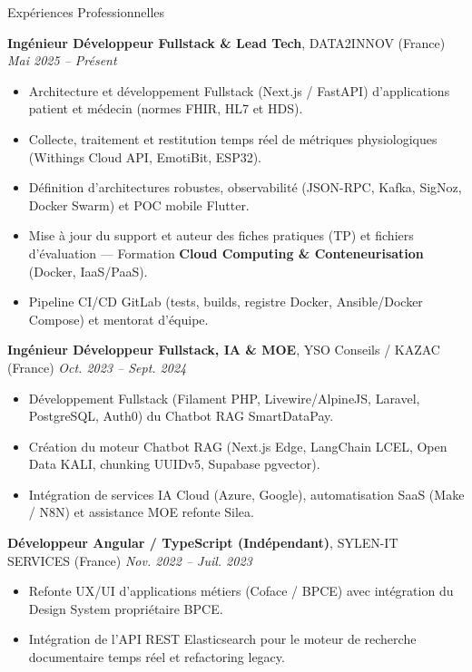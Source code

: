 \documentclass{resume}
\begin{document}
\begin{rSection}{Expériences Professionnelles}

{\bf Ingénieur Développeur Fullstack \& Lead Tech}, DATA2INNOV (France) \hfill {\em Mai 2025 -- Présent}
\begin{itemize} \itemsep -0.3em
    \item Architecture et développement Fullstack (Next.js / FastAPI) d'applications patient et médecin (normes FHIR, HL7 et HDS).
    \item Collecte, traitement et restitution temps réel de métriques physiologiques (Withings Cloud API, EmotiBit, ESP32).
    \item Définition d'architectures robustes, observabilité (JSON-RPC, Kafka, SigNoz, Docker Swarm) et POC mobile Flutter.
    \item Mise à jour du support et auteur des fiches pratiques (TP) et fichiers d'évaluation --- Formation {\bf Cloud Computing \& Conteneurisation} (Docker, IaaS/PaaS).
    \item Pipeline CI/CD GitLab (tests, builds, registre Docker, Ansible/Docker Compose) et mentorat d'équipe.
\end{itemize}

{\bf Ingénieur Développeur Fullstack, IA \& MOE}, YSO Conseils / KAZAC (France) \hfill {\em Oct. 2023 -- Sept. 2024}
\begin{itemize} \itemsep -0.3em
    \item Développement Fullstack (Filament PHP, Livewire/AlpineJS, Laravel, PostgreSQL, Auth0) du Chatbot RAG SmartDataPay.
    \item Création du moteur Chatbot RAG (Next.js Edge, LangChain LCEL, Open Data KALI, chunking UUIDv5, Supabase pgvector).
    \item Intégration de services IA Cloud (Azure, Google), automatisation SaaS (Make / N8N) et assistance MOE refonte Silea.
\end{itemize}

{\bf Développeur Angular / TypeScript (Indépendant)}, SYLEN-IT SERVICES (France) \hfill {\em Nov. 2022 -- Juil. 2023}
\begin{itemize} \itemsep -0.3em
    \item Refonte UX/UI d'applications métiers (Coface / BPCE) avec intégration du Design System propriétaire BPCE.
    \item Intégration de l'API REST Elasticsearch pour le moteur de recherche documentaire temps réel et refactoring legacy.
\end{itemize}


\end{rSection}
\end{document}
